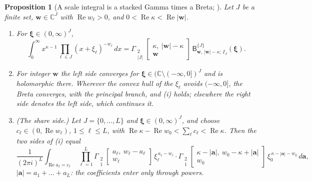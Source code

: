 \documentclass[11pt]{article}
\theoremstyle{plain}
\newtheorem{prop}{Proposition}[section]
\theoremstyle{definition}
\theoremstyle{remark}
\newcommand{\sB}{\mathsf B}
\newcommand{\Gst}[4]{\Gamma_{\substack{#1\\#2}}\!\begin{bmatrix}#3\\#4\end{bmatrix}}
\DeclareMathOperator{\re}{Re}
\begin{document}
\begin{prop}[A scale integral is a stacked Gamma times a Breta; {\cite[Prop.~15.1, p.~87; Cor.~15.4, p.~88]{F}}]\label{prop:scale}
Let $J$ be a finite set, $\mathbf w\in\mathbb C^J$ with $\re w_\ell>0$, and $0<\re\kappa<\re|\mathbf w|$.
\begin{enumerate}[label=(\roman*)]
\item For $\boldsymbol\xi\in(0,\infty)^J$,
\[
\int_0^\infty x^{\kappa-1}\prod_{\ell\in J}(x+\xi_\ell)^{-w_\ell}\,dx=\Gst{2}{|J|}{\kappa,\ |\mathbf w|-\kappa}{\mathbf w}\,\sB^{\{J\}}_{\mathbf w,\,|\mathbf w|-\kappa;\,I_J}(\boldsymbol\xi).
\]
\item For integer $\mathbf w$ the left side converges for $\boldsymbol\xi\in(\mathbb C\setminus(-\infty,0])^J$ and is holomorphic there. Wherever the convex hull of the $\xi_\ell$ avoids $(-\infty,0]$, the Breta converges, with the principal branch, and (i) holds; elsewhere the right side denotes the left side, which continues it.
\item (\emph{The share side.}) Let $J=\{0,\dots,L\}$ and $\boldsymbol\xi\in(0,\infty)^J$, and choose $c_\ell\in(0,\re w_\ell)$, $1\le\ell\le L$, with $\re\kappa-\re w_0<\sum_\ell c_\ell<\re\kappa$. Then the two sides of (i) equal
\[
\frac1{(2\pi i)^L}\int_{\re a_\ell=c_\ell}\ \prod_{\ell=1}^L\Gst21{a_\ell,\ w_\ell-a_\ell}{w_\ell}\,\xi_\ell^{\,a_\ell-w_\ell}\cdot\Gst21{\kappa-|\mathbf a|,\ w_0-\kappa+|\mathbf a|}{w_0}\,\xi_0^{\,\kappa-|\mathbf a|-w_0}\,d\mathbf a,
\]
$|\mathbf a|=a_1+\dots+a_L$: the coefficients enter only through powers.
\end{enumerate}
\end{prop}
\end{document}
